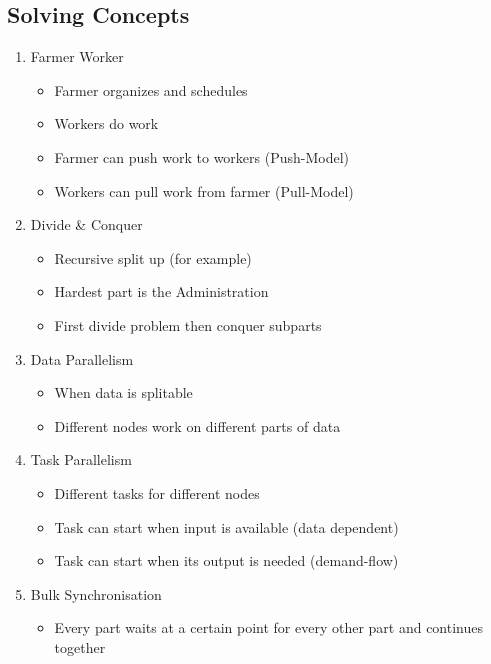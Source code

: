 \documentclass[a4paper]{article}
\begin{document}
\subsection{Solving Concepts}
\begin{enumerate}
\setlength{\itemsep}{0pt}
\item Farmer Worker
	\begin{itemize}
	\setlength{\itemsep}{-4pt}
	\item Farmer organizes and schedules
	\item Workers do work
	\item Farmer can push work to workers (Push-Model)
	\item Workers can pull work from farmer (Pull-Model)
	\end{itemize}
\item Divide \& Conquer
	\begin{itemize}
	\setlength{\itemsep}{-4pt}
	\item Recursive split up (for example)
	\item Hardest part is the Administration
	\item First divide problem then conquer subparts
	\end{itemize}
\item Data Parallelism
	\begin{itemize}
	\setlength{\itemsep}{-4pt}
	\item When data is splitable
	\item Different nodes work on different parts of data
	\end{itemize}
\item Task Parallelism
	\begin{itemize}
	\setlength{\itemsep}{-4pt}
	\item Different tasks for different nodes
	\item Task can start when input is available (data dependent)
	\item Task can start when its output is needed (demand-flow)
	\end{itemize}
\item Bulk Synchronisation
	\begin{itemize}
	\setlength{\itemsep}{-4pt}
	\item Every part waits at a certain point for every other part and continues together
	\end{itemize}
\end{enumerate}
\end{document}
